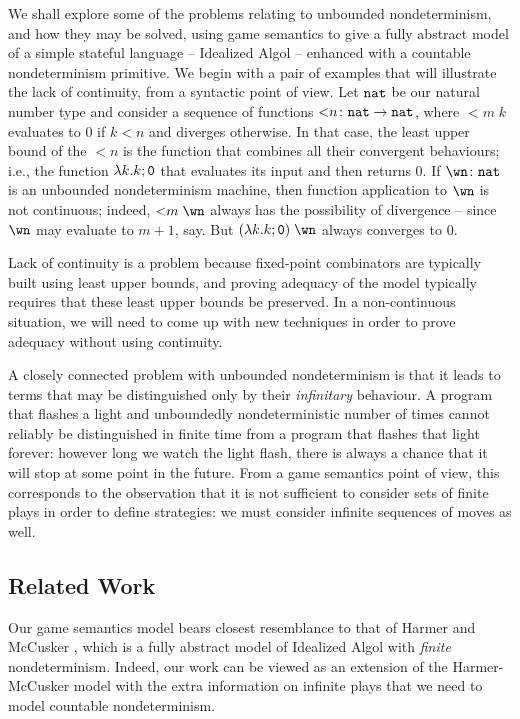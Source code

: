 \documentclass[sigplan,9pt,review]{acmart}\settopmatter{printfolios=true,printccs=false,printacmref=false}
\begin{document}
We shall explore some of the problems relating to unbounded nondeterminism, and how they may be solved, using game semantics to give a fully abstract model of a simple stateful language -- Idealized Algol -- enhanced with a countable nondeterminism primitive.  
We begin with a pair of examples that will illustrate the lack of continuity, from a syntactic point of view.  
Let ${\mathtt{nat}}$ be our natural number type and consider a sequence of functions ${<}n\colon{\mathtt{nat}}\to{\mathtt{nat}}$, where ${<}m\;k$ evaluates to $0$ if $k<n$ and diverges otherwise.
In that case, the least upper bound of the ${<}n$ is the function that combines all their convergent behaviours; i.e., the function $\lambda k.k;{\mathtt{0}}$ that evaluates its input and then returns $0$.
If $\wn\from\nat$ is an unbounded nondeterminism machine, then function application to $\wn$ is not continuous; indeed, ${<}m\;\wn$ always has the possibility of divergence -- since $\wn$ may evaluate to $m+1$, say.  
But $(\lambda k.k;\0)\;\wn$ always converges to $0$.

Lack of continuity is a problem because fixed-point combinators are typically built using least upper bounds, and proving adequacy of the model typically requires that these least upper bounds be preserved.  
In a non-continuous situation, we will need to come up with new techniques in order to prove adequacy without using continuity.

A closely connected problem with unbounded nondeterminism is that it leads to terms that may be distinguished only by their \emph{infinitary} behaviour.  
A program that flashes a light and unboundedly nondeterministic number of times cannot reliably be distinguished in finite time from a program that flashes that light forever: however long we watch the light flash, there is always a chance that it will stop at some point in the future.  
From a game semantics point of view, this corresponds to the observation that it is not sufficient to consider sets of finite plays in order to define strategies: we must consider infinite sequences of moves as well.  

\subsection{Related Work}

Our game semantics model bears closest resemblance to that of Harmer and McCusker \cite{mcCHFiniteND}, which is a fully abstract model of Idealized Algol with \emph{finite} nondeterminism.  
Indeed, our work can be viewed as an extension of the Harmer-McCusker model with the extra information on infinite plays that we need to model countable nondeterminism.  
\end{document}

